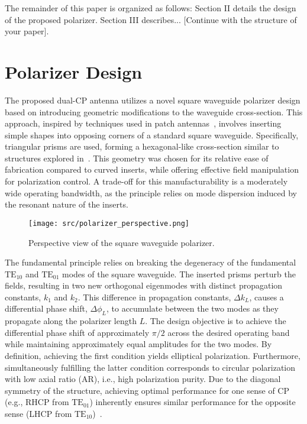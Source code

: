\documentclass[journal]{IEEEtran}
\newcommand{\TE}[2]{\text{TE}_{#1#2}}
\begin{document}
The remainder of this paper is organized as follows: Section II details the design of the proposed polarizer. Section III describes... [Continue with the structure of your paper].

\section{Polarizer Design}
\label{sec:polarizer_design}

The proposed dual-CP antenna utilizes a novel square waveguide polarizer design based on introducing geometric modifications to the waveguide cross-section. This approach, inspired by techniques used in patch antennas~\cite{cite_patch_antenna}, involves inserting simple shapes into opposing corners of a standard square waveguide. Specifically, triangular prisms are used, forming a hexagonal-like cross-section similar to structures explored in~\cite{bhardwaj-volakis:hexagonal-waveguides-new-class-of-waveguides-for-mmwave-circularly-polarized-horns}. This geometry was chosen for its relative ease of fabrication compared to curved inserts, while offering effective field manipulation for polarization control. A trade-off for this manufacturability is a moderately wide operating bandwidth, as the principle relies on mode dispersion induced by the resonant nature of the inserts.

\begin{figure}[!ht]
    \centering
    \texttt{[image: src/polarizer\_perspective.png]}
    \caption{\label{fig:polarizer-perspective} Perspective view of the square waveguide polarizer.}
\end{figure}

The fundamental principle relies on breaking the degeneracy of the fundamental $\TE 10$ and $\TE 01$ modes of the square waveguide. The inserted prisms perturb the fields, resulting in two new orthogonal eigenmodes with distinct propagation constants, $k_1$ and $k_2$. This difference in propagation constants, $\Delta k_L$, causes a differential phase shift, $\Delta\phi_L$, to accumulate between the two modes as they propagate along the polarizer length $L$. The design objective is to achieve the differential phase shift of approximately $\pi/2$ across the desired operating band while maintaining approximately equal amplitudes for the two modes. By definition, achieving the first condition yields elliptical polarization. Furthermore, simultaneously fulfilling the latter condition corresponds to circular polarization with low axial ratio (AR), i.e., high polarization purity. Due to the diagonal symmetry of the structure, achieving optimal performance for one sense of CP (e.g., RHCP from $\TE 01$) inherently ensures similar performance for the opposite sense (LHCP from $\TE 10$)~\cite{balanis:advanced-engineering-electromagnetics}.
\end{document}
